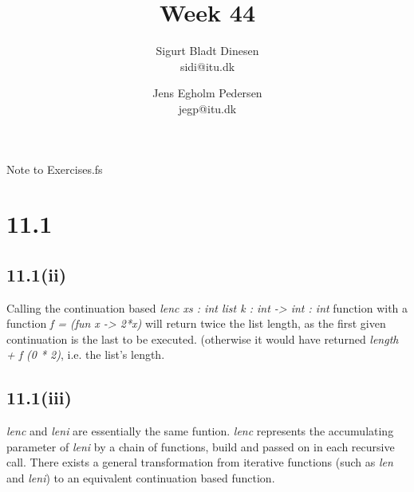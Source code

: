 \documentclass[a4paper, titlepage]{article}
\begin{document}
\title{Week 44}
\author{Sigurt Bladt Dinesen \\sidi{@}itu.dk 
  \and Jens Egholm Pedersen \\jegp{@}itu.dk}
\maketitle

Note to  Exercises.fs
\section*{11.1}
\subsection*{11.1(ii)}
Calling the continuation based \emph{lenc xs : int list k : int -> int : int}
function with a function \emph{f = (fun x -> 2*x)} will return twice the list
length, as the first given continuation is the last to be executed. (otherwise
it would have returned \emph{length + f (0 * 2)}, i.e. the list's length.

\subsection*{11.1(iii)}
\emph{lenc} and \emph{leni} are essentially the same funtion. \emph{lenc}
represents the accumulating parameter of \emph{leni} by a chain of functions,
build and passed on in each recursive call. There exists a general
transformation from iterative functions (such as \emph{len} and \emph{leni}) to
an equivalent continuation based function.
\end{document}
